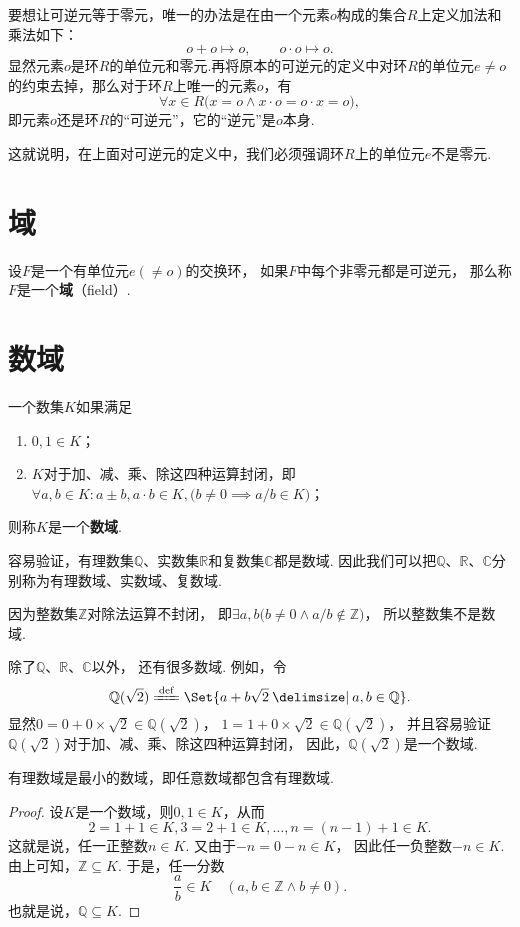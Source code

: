 \begin{example}
要想让可逆元等于零元，唯一的办法是在由一个元素\(o\)构成的集合\(R\)上定义加法和乘法如下：\[
o + o \mapsto o,
\qquad
o \cdot o \mapsto o.
\]显然元素\(o\)是环\(R\)的单位元和零元.再将原本的可逆元的定义中对环\(R\)的单位元\(e \neq o\)的约束去掉，那么对于环\(R\)上唯一的元素\(o\)，有\[
\forall x \in R \bigl( x = o \land x \cdot o = o \cdot x = o \bigr),
\]即元素\(o\)还是环\(R\)的“可逆元”，它的“逆元”是\(o\)本身.

这就说明，在上面对可逆元的定义中，我们必须强调环\(R\)上的单位元\(e\)不是零元.
\end{example}

\section{域}
\begin{definition}
设\(F\)是一个有单位元\(e(\neq o)\)的交换环，%
如果\(F\)中每个非零元都是可逆元，%
那么称\(F\)是一个\textbf{域}（field）.
\end{definition}

\section{数域}
\begin{definition}
一个数集\(K\)如果满足\begin{enumerate}
\item \(0,1 \in K\)；
\item \(K\)对于加、减、乘、除这四种运算封闭，即%
\(\forall a,b \in K :
a \pm b,
a \cdot b \in K,
\bigl( b \neq 0 \implies a/b \in K \bigr)
\)；
\end{enumerate}
则称\(K\)是一个\textbf{数域}.
\end{definition}
容易验证，有理数集\(\mathbb{Q}\)、实数集\(\mathbb{R}\)和复数集\(\mathbb{C}\)都是数域.
因此我们可以把\(\mathbb{Q}\)、\(\mathbb{R}\)、\(\mathbb{C}\)分别称为有理数域、实数域、复数域.

因为整数集\(\mathbb{Z}\)对除法运算不封闭，%
即\(\exists a, b \bigl( b \neq 0 \land a/b \notin \mathbb{Z} \bigr)\)，%
所以整数集不是数域.

除了\(\mathbb{Q}\)、\(\mathbb{R}\)、\(\mathbb{C}\)以外，%
还有很多数域.
例如，令{\def\Q{\mathbb{Q}(\sqrt{2})}%
\[
\Q
\defeq
\Set{ a + b \sqrt{2} \given a,b \in \mathbb{Q} }.
\]
显然\(0=0+0\times\sqrt{2}\in\Q\)，%
\(1=1+0\times\sqrt{2}\in\Q\)，%
并且容易验证\(\Q\)对于加、减、乘、除这四种运算封闭，%
因此，\(\Q\)是一个数域.
}%

\begin{theorem}
有理数域是最小的数域，即任意数域都包含有理数域.
\begin{proof}
设\(K\)是一个数域，则\(0,1 \in K\)，从而
\[
2 = 1 + 1 \in K,
3 = 2 + 1 \in K,
\dotsc,
n = (n-1) + 1 \in K.
\]
这就是说，任一正整数\(n \in K\).
又由于\(-n = 0 - n \in K\)，%
因此任一负整数\(-n \in K\).
由上可知，\(\mathbb{Z} \subseteq K\).
于是，任一分数\[
\frac{a}{b} \in K \quad(a,b\in\mathbb{Z} \land b\neq0).
\]
也就是说，\(\mathbb{Q} \subseteq K\).
\end{proof}
\end{theorem}

